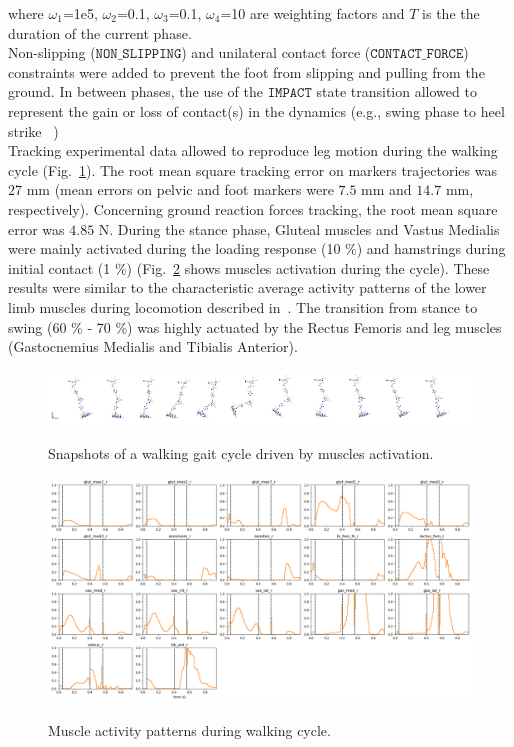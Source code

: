 \noindent where $\omega_1$=1e5, $\omega_2$=0.1, $\omega_3$=0.1, $\omega_4$=10 are  weighting factors and $T$ is the the duration of the current phase.\\

Non-slipping ($\mathtt{NON\_SLIPPING}$) and unilateral contact force ($\mathtt{CONTACT\_FORCE}$) constraints were added to prevent the foot from slipping and pulling from the ground. 
In between phases, the use of the $\mathtt{IMPACT}$ state transition allowed to represent the gain or loss of contact(s) in the dynamics (e.g., swing phase to heel strike ~\cite{felis_synthesis_2016}) \\

Tracking experimental data allowed to reproduce leg motion during the walking cycle (Fig.~\ref{fig:snapshots_multiphase_walking_cycle}). 
The root mean square tracking error on markers trajectories was $27$ mm (mean errors on pelvic and foot markers were $7.5$ mm and $14.7$ mm, respectively). 
Concerning ground reaction forces tracking, the root mean square error was $4.85$ N.
During the stance phase, Gluteal muscles and Vastus Medialis were mainly activated during the loading response (10 \%) and hamstrings during initial contact (1 \%) (Fig.~\ref{fig:muscles_activation_gait} shows muscles activation during the cycle). 
These results were similar to the characteristic average activity patterns of the lower limb muscles during locomotion described in~\cite{winter_biomechanics_1991}. 
The transition from stance to swing (60 \% - 70 \%) was highly actuated by the Rectus Femoris and leg muscles (Gastocnemius Medialis and Tibialis Anterior). 

\begin{figure}[t!]
\centering
\includegraphics[width=\textwidth]{figures/multiphase_walking_cycle.png}\\
\caption{Snapshots of a walking gait cycle driven by muscles activation.}
\label{fig:snapshots_multiphase_walking_cycle}
\end{figure}

\begin{figure}[t!]
\centering
\includegraphics[width=\textwidth]{figures/muscles_control_gait_example.png}\\
\caption{Muscle activity patterns during walking cycle.}
\label{fig:muscles_activation_gait}
\end{figure}
